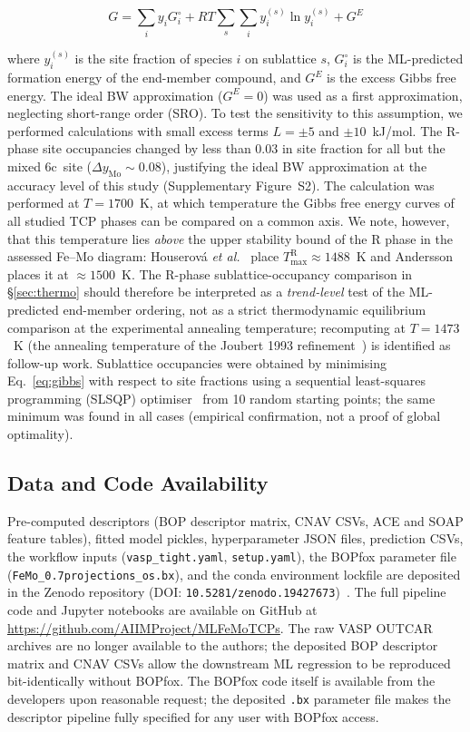 \begin{equation}
  G = \sum_i y_i G_i^\circ + RT \sum_s \sum_i y_i^{(s)} \ln y_i^{(s)} + G^E
  \label{eq:gibbs}
\end{equation}

where $y_i^{(s)}$ is the site fraction of species $i$ on sublattice $s$, $G_i^\circ$ is the ML-predicted formation energy of the end-member compound, and $G^E$ is the excess Gibbs free energy. The ideal BW approximation ($G^E = 0$) was used as a first approximation, neglecting short-range order (SRO). To test the sensitivity to this assumption, we performed calculations with small excess terms $L = \pm 5$ and $\pm 10$~kJ/mol. The R-phase site occupancies changed by less than 0.03 in site fraction for all but the mixed 6c~site ($\Delta y_{\text{Mo}} \sim 0.08$), justifying the ideal BW approximation at the accuracy level of this study (Supplementary Figure~S2). The calculation was performed at $T = 1700$~K, at which temperature the Gibbs free energy curves of all studied TCP phases can be compared on a common axis. We note, however, that this temperature lies \emph{above} the upper stability bound of the R phase in the assessed Fe--Mo diagram: Houserová \emph{et al.}~\cite{houserova_2002} place $T_\text{max}^\text{R} \approx 1488$~K and Andersson~\cite{andersson_1988} places it at $\approx 1500$~K. The R-phase sublattice-occupancy comparison in \S\ref{sec:thermo} should therefore be interpreted as a \emph{trend-level} test of the ML-predicted end-member ordering, not as a strict thermodynamic equilibrium comparison at the experimental annealing temperature; recomputing at $T = 1473$~K (the annealing temperature of the Joubert 1993 refinement~\cite{joubert_fe_mo}) is identified as follow-up work. Sublattice occupancies were obtained by minimising Eq.~\eqref{eq:gibbs} with respect to site fractions using a sequential least-squares programming (SLSQP) optimiser~\cite{slsqp} from 10 random starting points; the same minimum was found in all cases (empirical confirmation, not a proof of global optimality).

\subsection{Data and Code Availability}

Pre-computed descriptors (BOP descriptor matrix, CNAV CSVs, ACE and SOAP feature tables), fitted model pickles, hyperparameter JSON files, prediction CSVs, the workflow inputs (\texttt{vasp\_tight.yaml}, \texttt{setup.yaml}), the BOPfox parameter file (\texttt{FeMo\_0.7projections\_os.bx}), and the conda environment lockfile are deposited in the Zenodo repository (DOI: \texttt{10.5281/zenodo.19427673})~\cite{zenodo}. The full pipeline code and Jupyter notebooks are available on GitHub at \url{https://github.com/AIIMProject/MLFeMoTCPs}. The raw VASP OUTCAR archives are no longer available to the authors; the deposited BOP descriptor matrix and CNAV CSVs allow the downstream ML regression to be reproduced bit-identically without BOPfox. The BOPfox code itself is available from the developers upon reasonable request; the deposited \texttt{.bx} parameter file makes the descriptor pipeline fully specified for any user with BOPfox access.
